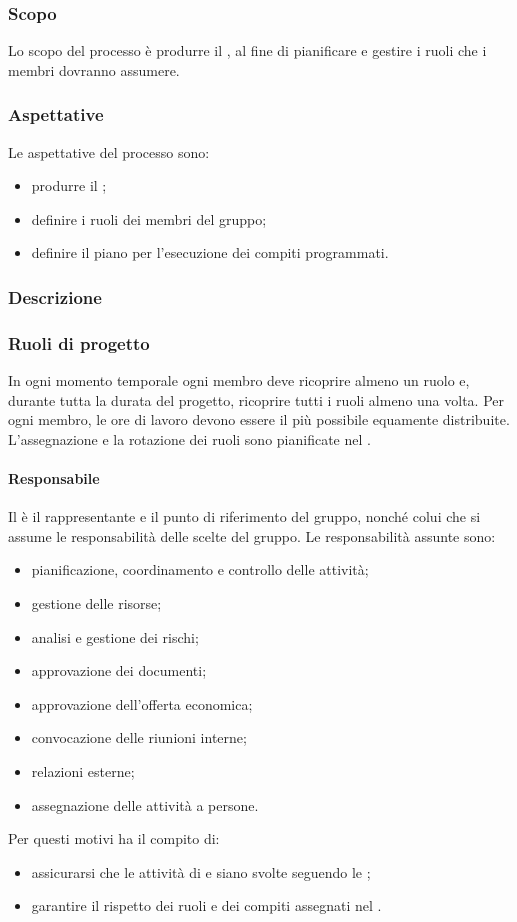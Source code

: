 \subsubsection{Scopo}
Lo scopo del processo è produrre il \PPdoc , al fine di pianificare e gestire i ruoli che i membri dovranno assumere.
\subsubsection{Aspettative}
Le aspettative del processo sono:
 \begin{itemize}
  \item produrre il \PPdoc ;
  \item definire i ruoli dei membri del gruppo;
  \item definire il piano per l'esecuzione dei compiti programmati.
 \end{itemize}
\subsubsection{Descrizione}
 
\subsubsection{Ruoli di progetto}
 In ogni momento temporale ogni membro deve ricoprire almeno un ruolo e, durante tutta la durata del progetto, ricoprire tutti i ruoli almeno una volta. Per ogni membro, le ore di lavoro devono essere il più possibile equamente distribuite. L'assegnazione e la rotazione dei ruoli sono pianificate nel \PPdocRR.
 \paragraph{Responsabile}
 Il \RESP{} è il rappresentante e il punto di riferimento del gruppo, nonché colui che si assume le responsabilità delle scelte del gruppo.
 Le responsabilità assunte sono:
 \begin{itemize}
  \item pianificazione, coordinamento e controllo delle attività;
  \item gestione delle risorse;
  \item analisi e gestione dei rischi;
  \item approvazione dei documenti;
  \item approvazione dell'offerta economica;
  \item convocazione delle riunioni interne;
  \item relazioni esterne;
  \item assegnazione delle attività a persone.
\end{itemize}
Per questi motivi ha il compito di:
\begin{itemize}
	\item assicurarsi che le attività di  e  siano svolte seguendo le \NPdoc;
	\item garantire il rispetto dei ruoli e dei compiti assegnati nel \PPdoc.
\end{itemize}
